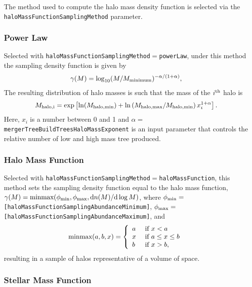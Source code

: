 The method used to compute the halo mass density function is selected via the {\tt haloMassFunctionSamplingMethod} parameter.

\subsubsection{Power Law}

Selected with {\tt haloMassFunctionSamplingMethod}$=${\tt powerLaw}, under this method the sampling density function is given by
\begin{equation}
\gamma(M) = \log_{10}(M/M_{\rm minimum})^{-\alpha/(1+\alpha)},
\end{equation}
The resulting distribution of halo masses is such that the mass of the $i^{\rm th}$ halo is
\begin{equation}
 M_{\rm halo,i} = \exp\left[ \ln(M_{\rm halo,min}) + \ln\left({M_{\rm halo,max}/M_{\rm halo,min}}\right) x_i^{1+\alpha} \right].
\end{equation}
Here, $x_i$ is a number between 0 and 1 and $\alpha=${\tt mergerTreeBuildTreesHaloMassExponent} is an input parameter that controls the relative number of low and high mass tree produced.

\subsubsection{Halo Mass Function}

Selected with {\tt haloMassFunctionSamplingMethod}$=${\tt haloMassFunction}, this method sets the sampling density function equal to the halo mass function, $\gamma(M) = \hbox{minmax}(\phi_{\rm min},\phi_{\rm max},{\rm d} n(M)/{\rm d}\log M)$, where $\phi_{\rm min}=${\tt [haloMassFunctionSamplingAbundanceMinimum]}, $\phi_{\rm max}=${\tt [haloMassFunctionSamplingAbundanceMaximum]}, and
\begin{equation}
 \hbox{minmax}(a,b,x) = \left\{\begin{array}{ll}a & \hbox{ if } x < a \\ x & \hbox{ if } a \leq x \leq b\\ b & \hbox{ if } x > b,\end{array}\right.
\end{equation}
resulting in a sample of halos representative of a volume of space.

\subsubsection{Stellar Mass Function}

